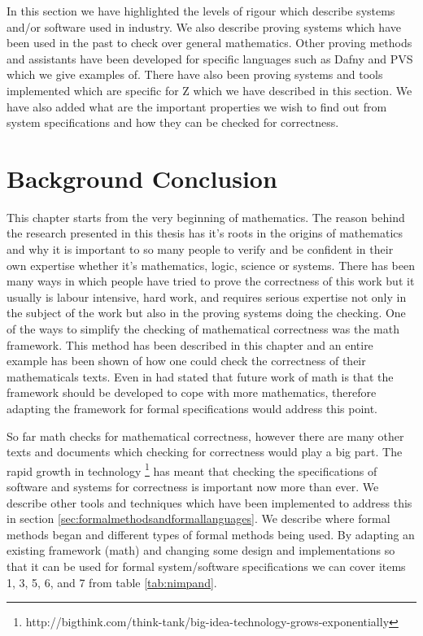 In this section we have highlighted the levels of rigour which describe systems and/or software used in industry. We also describe proving systems which have been used in the past to check over general mathematics. Other proving methods and assistants have been developed for specific languages such as Dafny and PVS which we give examples of. There have also been proving systems and tools implemented which are specific for Z which we have described in this section. We have also added what are the important properties we wish to find out from system specifications and how they can be checked for correctness.

\section{Background Conclusion}

This chapter starts from the very beginning of mathematics. The reason behind the research presented in this thesis has it's roots in the origins of mathematics and why it is important to so many people to verify and be confident in their own expertise whether it's mathematics, logic, science or systems. There has been many ways in which people have tried to prove the correctness of this work but it usually is labour intensive, hard work, and requires serious expertise not only in the subject of the work but also in the proving systems doing the checking. One of the ways to simplify the checking of mathematical correctness was the \gls{math} framework. This method has been described in this chapter and an entire example has been shown of how one could check the correctness of their mathematicals texts. Even in \cite{lamarphd} had stated that future work of \gls{math} is that the framework should be developed to cope with more mathematics, therefore adapting the framework for formal specifications would address this point.

So far \gls{math} checks for mathematical correctness, however there are many other texts and documents which checking for correctness would play a big part. The rapid growth in technology \footnote{http://bigthink.com/think-tank/big-idea-technology-grows-exponentially} has meant that checking the specifications of software and systems for correctness is important now more than ever. We describe other tools and techniques which have been implemented to address this in section \ref{sec:formalmethodsandformallanguages}.  We describe where formal methods began and different types of formal methods being used. By adapting an existing framework (\gls{math}) and changing some design and implementations so that it can be used for formal system/software specifications we can cover items 1, 3, 5, 6, and 7 from table \ref{tab:nimpand}.


